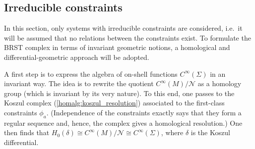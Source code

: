\subsection{Irreducible constraints}

    In this section, only systems with irreducible constraints are considered, i.e.~it will be assumed that no relations between the constraints exist. To formulate the BRST complex in terms of invariant geometric notions, a homological and differential-geometric approach will be adopted.

    A first step is to express the algebra of on-shell functions $C^\infty(\Sigma)$ in an invariant way. The idea is to rewrite the quotient $C^\infty(M)/\mathcal{N}$ as a homology group (which is invariant by its very nature). To this end, one passes to the Koszul complex (\cref{homalg:koszul_resolution}) associated to the first-class constraints $\phi_a$. (Independence of the constraints exactly says that they form a regular sequence and, hence, the complex gives a homological resolution.) One then finds that $H_0(\delta)\cong C^\infty(M)/\mathcal{N}\cong C^\infty(\Sigma)$, where $\delta$ is the Koszul differential.

